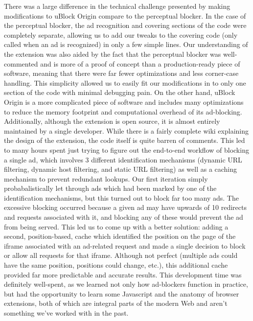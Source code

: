 There was a large difference in the technical challenge presented by making modifications to uBlock Origin compare to the perceptual blocker.
In the case of the perceptual blocker, the ad recognition and covering sections of the code were completely separate, allowing us to add our tweaks to the covering code (only called when an ad is recognized) in only a few simple lines.
Our understanding of the extension was also aided by the fact that the perceptual blocker was well-commented and is more of a proof of concept than a production-ready piece of software, meaning that there were far fewer optimizations and less corner-case handling.
This simplicity allowed us to easily fit our modifications in to only one section of the code with minimal debugging pain.
On the other hand, uBlock Origin is a more complicated piece of software and includes many optimizations to reduce the memory footprint and computational overhead of its ad-blocking.
Additionally, although the extension is open source, it is almost entirely maintained by a single developer.
While there is a fairly complete wiki explaining the design of the extension, the code itself is quite barren of comments.
This led to many hours spent just trying to figure out the end-to-end workflow of blocking a single ad, which involves 3 different identification mechanisms (dynamic URL filtering, dynamic host filtering, and static URL filtering) as well as a caching mechanism to prevent redundant lookups.
Our first iteration simply probabalistically let through ads which had been marked by one of the identification mechanisms, but this turned out to block far too many ads.
The excessive blocking occurred because a given ad may have upwards of 10 redirects and requests associated with it, and blocking any of these would prevent the ad from being served.
This led us to come up with a better solution: adding a second, position-based, cache which identified the position on the page of the iframe associated with an ad-related request and made a single decision to block or allow all requests for that iframe.
Although not perfect (multiple ads could have the same position, positions could change, etc.), this additional cache provided far more predictable and accurate results.
This development time was definitely well-spent, as we learned not only how ad-blockers function in practice, but had the opportunity to learn some Javascript and the anatomy of browser extensions, both of which are integral parts of the modern Web and aren't something we've worked with in the past.

